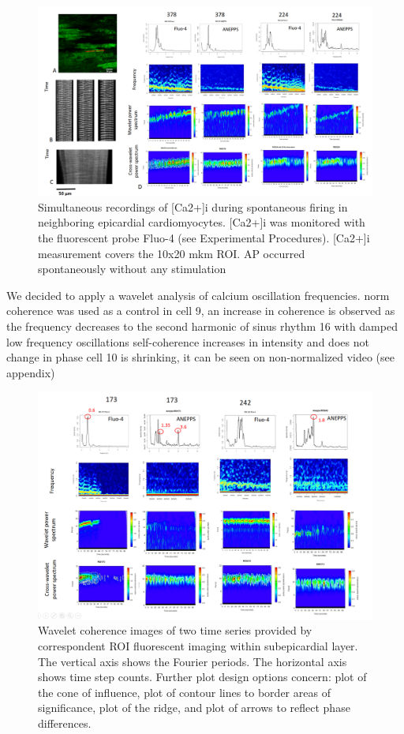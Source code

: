 \documentclass{biophys-new}
\begin{document}
\begin{figure}[hbt!]
\centering
\includegraphics[width=0.9\linewidth]{fig10.png}
\caption{Simultaneous recordings of [Ca2+]i during spontaneous firing in neighboring epicardial cardiomyocytes. [Ca2+]i was monitored with the fluorescent probe Fluo-4 (see Experimental Procedures). [Ca2+]i measurement covers the 10x20 mkm ROI. AP occurred spontaneously without any stimulation}
\label{fig:fig10}
\end{figure}

We decided to apply a wavelet analysis of calcium oscillation frequencies. \cite{addison2018introduction}
norm coherence was used as a control
in cell 9, an increase in coherence is observed as the frequency decreases to the second harmonic of sinus rhythm
16 with damped low frequency oscillations
self-coherence increases in intensity and does not change in phase
cell 10 is shrinking, it can be seen on non-normalized video (see appendix)

\begin{figure}[hbt!]
\centering
\includegraphics[width=0.9\linewidth]{fig11.png}
\caption{Wavelet coherence images of two time series provided by correspondent ROI fluorescent imaging within subepicardial layer.
The vertical axis shows the Fourier periods. The horizontal axis shows time step counts.
Further plot design options concern: plot of the cone of influence, plot of contour lines to border areas of significance, plot of the ridge, and plot of arrows to reflect phase differences.}
\label{fig:fig11}
\end{figure}
\end{document}

